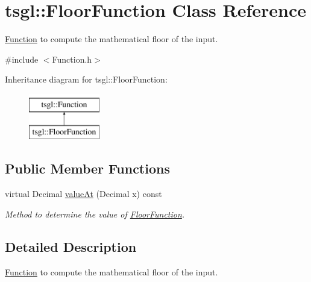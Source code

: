 \hypertarget{classtsgl_1_1_floor_function}{\section{tsgl\-:\-:\-Floor\-Function \-Class \-Reference}
\label{classtsgl_1_1_floor_function}
}


\hyperlink{classtsgl_1_1_function}{\-Function} to compute the mathematical floor of the input.  




{\ttfamily \#include $<$\-Function.\-h$>$}

\-Inheritance diagram for tsgl\-:\-:\-Floor\-Function\-:\begin{figure}[H]
\begin{center}
\leavevmode
\includegraphics[height=2.000000cm]{classtsgl_1_1_floor_function}
\end{center}
\end{figure}
\subsection*{\-Public \-Member \-Functions}
\begin{DoxyCompactItemize}
\item 
virtual \-Decimal \hyperlink{classtsgl_1_1_floor_function_a73eedb6a65c55e070541b08c49d9f170}{value\-At} (\-Decimal x) const 
\begin{DoxyCompactList}\small\item\em \-Method to determine the value of \hyperlink{classtsgl_1_1_floor_function}{\-Floor\-Function}. \end{DoxyCompactList}\end{DoxyCompactItemize}


\subsection{\-Detailed \-Description}
\hyperlink{classtsgl_1_1_function}{\-Function} to compute the mathematical floor of the input. 

